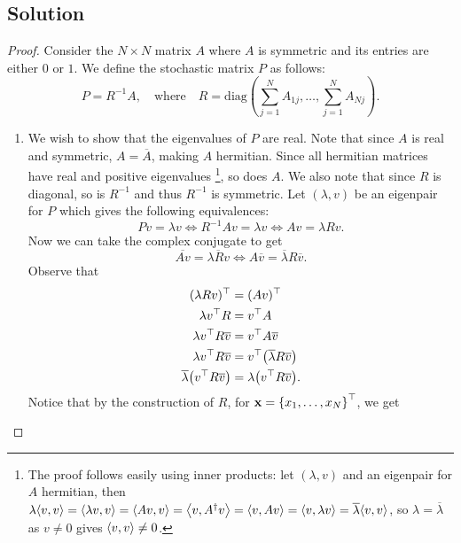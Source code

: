 \documentclass[12pt]{report}
\newenvironment{problem}{}{\newpage}
\begin{document}
\begin{problem}
\subsection*{Solution}
\begin{proof}
Consider the $N \times N$ matrix $A$ where $A$ is symmetric and its entries are either $0$ or $1$. We define the stochastic matrix $P$ as follows: 
\begin{equation*}
    P = R^{-1}A, \quad \text{where} \quad R = \text{diag} \left( \sum_{j=1}^{N} A_{1j}, \ldots, \sum_{j=1}^{N} A_{Nj} \right).
\end{equation*}
\begin{enumerate}
    \item 
    We wish to show that the eigenvalues of $P$ are real. Note that since $A$ is real and symmetric, $A = \overline{A}$, making $A$ hermitian. Since all hermitian matrices have real and positive eigenvalues \footnote{The proof follows easily using inner products: let $(\lambda,v)$ and an eigenpair for $A$ hermitian, then $\lambda {\left\langle v,v\right\rangle} = {\left\langle\lambda v, v\right\rangle} = {\left\langle Av,v\right\rangle} = {\left\langle v,A^{\dagger}v\right\rangle} = {\left\langle v,Av\right\rangle} = {\left\langle v,\lambda v\right\rangle} = \overline{\lambda}{\left\langle v,v\right\rangle}$, so $\lambda = \overline{\lambda}$ as $v\neq 0$ gives ${\left\langle v,v\right\rangle} \neq 0$.}, so does $A$. We also note that since $R$ is diagonal, so is $R^{-1}$ and thus $R^{-1}$ is symmetric. Let $(\lambda,v)$ be an eigenpair for $P$ which gives the following equivalences:
    \begin{equation*}
        Pv = \lambda v \iff R^{-1}Av = \lambda v \iff Av = \lambda Rv.
    \end{equation*}
    Now we can take the complex conjugate to get
    \begin{equation*}
        \overline{Av} = \overline{\lambda Rv} \iff A\overline{v} = \overline{\lambda}R\overline{v}.
    \end{equation*}
    Observe that 
    \begin{align*}
          (\lambda Rv)^\top &= (Av)^\top\\ 
        \lambda v^\top R &= v^\top A \\
        \lambda v^\top R \overline{v} &= v^\top A \overline{v}\\
        \lambda v^\top R \overline{v} &= v^\top {\left(\overline{\lambda}R\overline{v}\right)}\\
        \overline{\lambda} {\left(v^\top R\overline{v}\right)} &= \lambda {\left(v^\top R \overline{v}\right)}.
    \end{align*}
    Notice that by the construction of $R$, for $\mathbf{x}={\left\{x_1,\dots,x_N\right\}}^\top$, we get

\end{enumerate}
\end{proof}
\end{problem}
\end{document}
